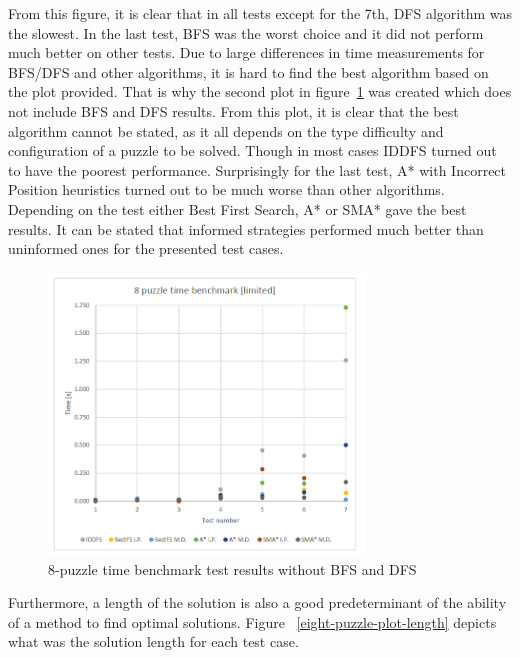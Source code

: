 \documentclass[12pt]{article}
\begin{document}
From this figure, it is clear that in all tests except for the 7th,  DFS algorithm was the slowest. In the last test, BFS was the worst choice and it did not perform much better on other tests. Due to large differences in time measurements for BFS/DFS and other algorithms, it is hard to find the best algorithm based on the plot provided. That is why the second plot in figure~\ref{eight-puzzle-plot-limited} was created which does not include BFS and DFS results. From this plot, it is clear that the best algorithm cannot be stated, as it all depends on the type difficulty and configuration of a puzzle to be solved. Though in most cases IDDFS turned out to have the poorest performance. Surprisingly for the last test, A* with Incorrect Position heuristics turned out to be much worse than other algorithms. Depending on the test either Best First Search, A* or SMA* gave the best results. It can be stated that informed strategies performed much better than uninformed ones for the presented test cases.

 \begin{figure}[h]
    \includegraphics[width=0.75\textwidth]{8_puzzle_plot_limited}
    \centering
    \caption{8-puzzle time benchmark test results without BFS and DFS}
\label {eight-puzzle-plot-limited}
\end{figure}

Furthermore, a length of the solution is also a good predeterminant of the ability of a method to find optimal solutions. Figure ~\ref{eight-puzzle-plot-length} depicts what was the solution length for each test case.
\end{document}
